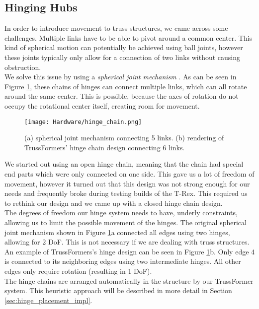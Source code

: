 \subsection{Hinging Hubs}\label{sec:hinges}
In order to introduce movement to truss structures, we came across some challenges. Multiple links have to be able to pivot around a common center. This kind of spherical motion can potentially be achieved using ball joints, however these joints typically only allow for a connection of two links without causing obstruction.\\
We solve this issue by using a \textit{spherical joint mechanism} \cite{sofla:2009, spinos2:2017}. As can be seen in Figure \ref{fig:hinge_chain}, these chains of hinges can connect multiple links, which can all rotate around the same center. This is possible, because the axes of rotation do not occupy the rotational center itself, creating room for movement.\\
\begin{figure}[ht!]
    \texttt{[image: Hardware/hinge\_chain.png]}
    \centering
    \caption{(a) spherical joint mechanism connecting 5 links. (b) rendering of TrussFormers' hinge chain design connecting 6 links.}
    \label{fig:hinge_chain}
\end{figure}
We started out using an open hinge chain, meaning that the chain had special end parts which were only connected on one side. This gave us a lot of freedom of movement, however it turned out that this design was not strong enough for our needs and frequently broke during testing builds of the T-Rex. This required us to rethink our design and we came up with a closed hinge chain design.\\
The degrees of freedom our hinge system needs to have, underly constraints, allowing us to limit the possible movement of the hinges. The original spherical joint mechanism shown in Figure \ref{fig:hinge_chain}a connected all edges using two hinges, allowing for 2 DoF. This is not necessary if we are dealing with truss structures. An example of TrussFormers's hinge design can be seen in Figure \ref{fig:hinge_chain}b. Only edge 4 is connected to its neighboring edges using two intermediate hinges. All other edges only require rotation (resulting in 1 DoF).\\
The hinge chains are arranged automatically in the structure by our TrussFormer system. This heuristic approach will be described in more detail in Section \ref{sec:hinge_placement_impl}.

